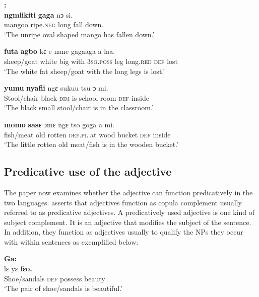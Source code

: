 \documentclass[output=paper,
modfonts
]{langscibook}
\begin{document}
\ea\label{ex:caesar:38}
\textbf{:}\\
 \textbf{{ngmlikiti}} \textbf{{gaga}}  {nↄ} {si.}\\
 mangoo ripe.\textsc{neg} long fall down.\\
\glt  ‘The unripe oval shaped mango has fallen down.’
\z


\ea\label{ex:caesar:39}
 \textbf{{futa}} \textbf{{agbo}} {kɛ} {e} {nane} {gagaaga} {a} {laa.}\\
 sheep/goat white big with 3\textsc{sg}.\textsc{poss} leg long.\textsc{red} \textsc{def} lost\\
\glt  ‘The white fat sheep/goat with the long legs is lost.’
\z



\ea\label{ex:caesar:40}
 \textbf{{yumu}} \textbf{{nyafii}} {ngɛ} {sukuu} {tsu} {ↄ} {mi.}\\
 Stool/chair black \textsc{dim} is school room \textsc{def} inside\\
\glt  ‘The black small stool/chair is in the classroom.’
\z



\ea\label{ex:caesar:41}
 \textbf{{momo}} \textbf{{sasɛ}}  {ↄmɛ} {ngɛ} {tso} {goga} {a} {mi.}\\
 fish/meat old rotten \textsc{def}.\textsc{pl} at wood bucket \textsc{def} inside\\
\glt ‘The little rotten old meat/fish is in the wooden bucket.’
\z



\subsection{Predicative use of the adjective}\label{sec:caesar:4.3} 

The paper now examines whether the adjective can function predicatively in the two languages. \citet[106]{Dixon2004} asserts that adjectives function as copula complement usually referred to as predicative adjectives. A predicatively used adjective is one kind of subject complement. It is an adjective that modifies the subject of the sentence. In addition, they function as adjectives usually to qualify the NPs they occur with within sentences as exemplified below:


\ea\label{ex:caesar:42}
\textbf{Ga:} \\
 {lɛ} {yɛ} \textbf{{fɛo.}}\\
 Shoe/sandals \textsc{def} possess beauty\\
\glt  ‘The pair of shoe/sandals is beautiful.’
\z
\end{document}
